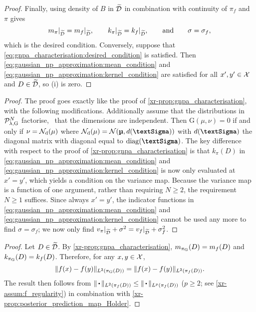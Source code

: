\documentclass[12pt, twoside]{report}
\newcommand{\xrprefix}[1]{xr-#1}
\begin{document}
\begin{proof}
    Finally, using density of $B$ in $\tD$ in combination with continuity of $\pi_f$ and $\pi$ gives
    \begin{equation} \label{eq:gnpa_characterisation:desired_condition}
        m_\pi|_{\tD} = m_f|_{\tD},
        \qquad
        k_\pi|_{\tD} = k_f|_{\tD},
        \qquad
        \text{and}
        \qquad
        \sigma = \sigma_f,
    \end{equation}
    which is the desired condition.
%
    Conversely, suppose that \eqref{eq:gnpa_characterisation:desired_condition} is satisfied.
    Then \eqref{eq:gaussian_np_approximation:mean_condition} and \eqref{eq:gaussian_np_approximation:kernel_condition} are satisfied for all $x', y' \in \X$ and $D \in \tD$, so (i) is zero.
\end{proof}

\begin{proof}
    The proof goes exactly like the proof of \cref{\xrprefix{prop:gnpa_characterisation}}, with the following modifications.
    Additionally assume that the distributions in $\Pc\ss{$\lambda$,G}^N$ factorise, \ie~that the dimensions are independent.
    Then $\text{G}(\mu, \nu) = 0$ if and only if $\nu = \mathcal{N}\ss{d}(\mu)$
    where $\Nc\ss{d}(\mu) = \Nc(\vmu, d(\mSigma))$ with $d(\mSigma)$ the diagonal matrix with diagonal equal to $\diag(\mSigma)$.
    The key difference with respect to the proof of \cref{\xrprefix{prop:gnpa_characterisation}} is that $k_\pi(D)$ in \eqref{eq:gaussian_np_approximation:mean_condition} and \eqref{eq:gaussian_np_approximation:kernel_condition} is now only evaluated at $x' = y'$, which yields a condition on the variance map.
    Because the variance map is a function of one argument,
    rather than requiring $N \ge 2$, the requirement $N \ge 1$ suffices.
    Since always $x' = y'$,
    the indicator functions in \eqref{eq:gaussian_np_approximation:mean_condition} and \eqref{eq:gaussian_np_approximation:kernel_condition} cannot be used any more to find $\sigma = \sigma_f$;
    we now only find $v_\pi|_{\tD} + \sigma^2 = v_f|_{\tD} + \sigma_f^2$.
\end{proof}

\begingroup
    \newcommand{\possibleprefix}[1]{\xrprefix{#1}}
\endgroup
\begin{proof}
    Let $D \in \tD$.
    By \cref{\xrprefix{prop:gnpa_characterisation}}, $m_{\pi\ss{G}}(D) = m_f(D)$ and $k_{\pi\ss{G}}(D) = k_f(D)$.
    Therefore, for any $x, y \in \X$,
    \begin{equation}
        \norm{f(x) - f(y)}_{L^2(\pi\ss{G}(D))}
        = \norm{f(x) - f(y)}_{L^2(\pi_f(D))}.
    \end{equation}
    The result then follows from $\norm{\vardot}_{L^2(\pi_f(D))} \le \norm{\vardot}_{L^p(\pi_f(D))}$ ($p \ge 2$; see \cref{\xrprefix{assum:f_regularity}}) in combination with \cref{\xrprefix{prop:posterior_prediction_map_Holder}}.
\end{proof}
\end{document}
